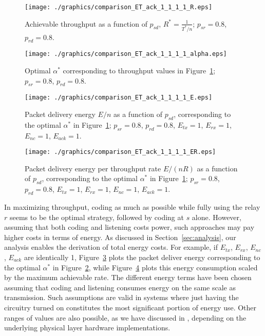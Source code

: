 \documentclass[journal, letterpaper]{IEEEtran}
\begin{document}
\begin{figure}[t!]
  \centering
    \texttt{[image: ./graphics/comparison\_ET\_ack\_1\_1\_1\_1\_R.eps]}
    \caption{Achievable throughput as a function of $p_{sd}$, $R^*=\frac{1}{T^*/n}$; $p_{sr}=0.8$, $p_{rd}=0.8$.}
    \label{fig:comparison_psd}
\end{figure}
\begin{figure}[t!]
\centering
  \texttt{[image: ./graphics/comparison\_ET\_ack\_1\_1\_1\_1\_alpha.eps]}
  \caption{Optimal $\alpha^*$ corresponding to throughput values in Figure~\ref{fig:comparison_psd}; $p_{sr}=0.8$, $p_{rd}=0.8$.}
  \label{fig:comparison_psd_alpha}
\end{figure}
\begin{figure}[t!]
  \centering
    \texttt{[image: ./graphics/comparison\_ET\_ack\_1\_1\_1\_1\_E.eps]}
    \caption{Packet delivery energy $E/n$ as a function of $p_{sd}$, corresponding to the optimal $\alpha^*$ in Figure~\ref{fig:comparison_psd}; $p_{sr}=0.8$, $p_{rd}=0.8$, $E_{tx}=1$, $E_{rx}=1$, $E_{nc}=1$, $E_{ack}=1$.}
    \label{fig:comparison_ET_ack_1_1_1_1_E}
 \end{figure}
\begin{figure}[t!]
\centering
  \texttt{[image: ./graphics/comparison\_ET\_ack\_1\_1\_1\_1\_ER.eps]}
  \caption{Packet delivery energy per throughput rate $E/(nR)$ as a function of $p_{sd}$, corresponding to the optimal $\alpha^*$ in Figure~\ref{fig:comparison_psd}; $p_{sr}=0.8$, $p_{rd}=0.8$, $E_{tx}=1$, $E_{rx}=1$, $E_{nc}=1$, $E_{ack}=1$.}
  \label{fig:comparison_ET_ack_1_1_1_1_ER}
\end{figure}

In maximizing throughput, coding as much as possible while fully using the relay $r$ seems to be the optimal strategy, followed by coding at $s$ alone. However, assuming that both coding and listening costs power, such approaches may pay higher costs in terms of energy. As discussed in Section~\ref{sec:analysis}, our analysis enables the derivation of total energy costs. For example, if $E_{tx}$, $E_{rx}$, $E_{nc}$, $E_{ack}$ are identically 1, Figure~\ref{fig:comparison_ET_ack_1_1_1_1_E} plots the packet deliver energy corresponding to the optimal $\alpha^*$ in Figure~\ref{fig:comparison_psd_alpha}, while Figure~\ref{fig:comparison_ET_ack_1_1_1_1_ER} plots this energy consumption scaled by the maximum achievable rate. The different energy terms have been chosen assuming that coding and listening consumes energy on the same scale as transmission. Such assumptions are valid in systems where just having the circuitry turned on constitutes the most significant portion of energy use. Other ranges of values are also possible, as we have discussed in \cite{shi2011both}, depending on the underlying physical layer hardware implementations.
\end{document}
